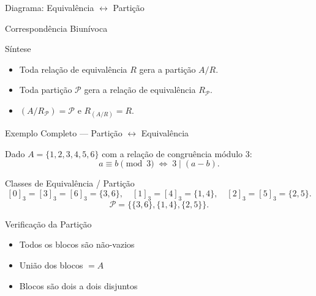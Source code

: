 \documentclass[9pt]{beamer}
\begin{document}
\begin{frame}{Diagrama: Equivalência $\leftrightarrow$ Partição}

\begin{block}{Correspondência Biunívoca}
\centering
{}
\end{block}

\begin{block}{Síntese}
\begin{itemize}
  \item Toda relação de equivalência $R$ gera a partição $A/R$.
  \item Toda partição $\mathcal{P}$ gera a relação de equivalência $R_\mathcal{P}$.
  \item $(A/R_\mathcal{P}) = \mathcal{P}$ e $R_{(A/R)} = R$.
\end{itemize}
\end{block}

\end{frame}

\begin{frame}{Exemplo Completo — Partição $\leftrightarrow$ Equivalência}

\begin{block}{Dado}
$A = \{1,2,3,4,5,6\}$ com a relação de congruência módulo $3$:
\[
a \equiv b \pmod{3} \;\Longleftrightarrow\; 3 \mid (a-b).
\]
\end{block}

\begin{block}{Classes de Equivalência / Partição}
\[
[0]_3 = [3]_3 = [6]_3 = \{3,6\},\quad [1]_3 = [4]_3 = \{1,4\},\quad [2]_3 = [5]_3 = \{2,5\}.
\]
\[
\mathcal{P} = \bigl\{\{3,6\},\{1,4\},\{2,5\}\bigr\}.
\]
\end{block}

\begin{block}{Verificação da Partição}
\begin{itemize}
  \item Todos os blocos são não-vazios \checkmark
  \item União dos blocos $= A$ \checkmark
  \item Blocos são dois a dois disjuntos \checkmark
\end{itemize}
\end{block}

\end{frame}
\end{document}
